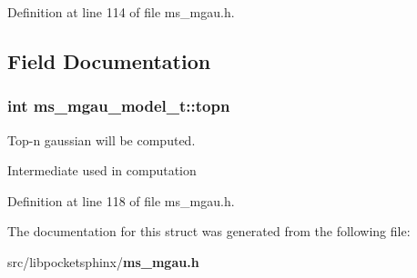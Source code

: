 Definition at line 114 of file ms\+\_\+mgau.\+h.



\subsection{Field Documentation}
\subsubsection[{topn}]{\setlength{\rightskip}{0pt plus 5cm}int ms\+\_\+mgau\+\_\+model\+\_\+t\+::topn}\label{structms__mgau__model__t_a0a67ef79bd74c55734b0944f0d61b668}


Top-\/n gaussian will be computed. 

Intermediate used in computation 

Definition at line 118 of file ms\+\_\+mgau.\+h.



The documentation for this struct was generated from the following file\+:\begin{DoxyCompactItemize}
\item 
src/libpocketsphinx/{\bf ms\+\_\+mgau.\+h}\end{DoxyCompactItemize}
